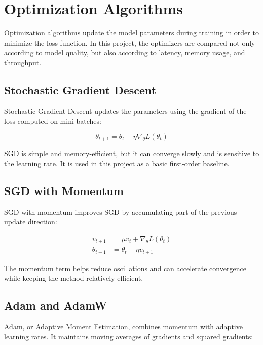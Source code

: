 \chapter{Optimization Algorithms}

\vspace*{0.3cm}

Optimization algorithms update the model parameters during training in order to
minimize the loss function. In this project, the optimizers are compared not only
according to model quality, but also according to latency, memory usage, and
throughput.

\section{Stochastic Gradient Descent}

Stochastic Gradient Descent updates the parameters using the gradient of the loss
computed on mini-batches:

\begin{equation}
    \theta_{t+1} = \theta_t - \eta \nabla_{\theta} L(\theta_t)
\end{equation}

SGD is simple and memory-efficient, but it can converge slowly and is sensitive
to the learning rate. It is used in this project as a basic first-order baseline.

\section{SGD with Momentum}

SGD with momentum improves SGD by accumulating part of the previous update
direction:

\begin{align}
    v_{t+1} &= \mu v_t + \nabla_{\theta} L(\theta_t) \\
    \theta_{t+1} &= \theta_t - \eta v_{t+1}
\end{align}

The momentum term helps reduce oscillations and can accelerate convergence while
keeping the method relatively efficient.

\section{Adam and AdamW}

Adam, or Adaptive Moment Estimation, combines momentum with adaptive learning
rates. It maintains moving averages of gradients and squared gradients:

